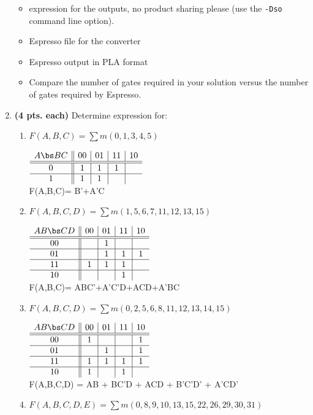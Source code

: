 \begin{enumerate}
\begin{itemize}
\item \SOPmin expression for the outputs, no product sharing please
(use the \verb+-Dso+ command line option).
\item Espresso file for the converter
\item Espresso output in PLA format
\item Compare the number of gates required in your solution
versus the number of gates required by Espresso.
\end{itemize}

\item {\bf (4 pts. each)} Determine \SOPmin expression for:
\begin{enumerate}
\item $F(A,B,C)=\sum m(0,1,3,4,5)$

\begin{solution}{
$\begin{array} {c||c|c|c|c}
   A   \bs B C  & 00 & 01 & 11 & 10 \\ \hline \hline
       0        &  1 & 1  & 1  &    \\ \hline
       1        &  1 & 1  &    &    \\ 
\end{array}$ \\
F(A,B,C)= B'+A'C
} \end{solution}
\item $F(A,B,C,D)=\sum m(1,5,6,7,11,12,13,15)$

\begin{solution}{
$\begin{array} {c||c|c|c|c}
   A B \bs C D   & 00 & 01 & 11 & 10 \\ \hline \hline
       00        &    & 1  &    &    \\ \hline
       01        &    & 1  & 1  & 1  \\ \hline
       11        & 1  & 1  & 1  &    \\ \hline
       10        &    &    & 1  &    \\
\end{array}$  \\
F(A,B,C)= ABC'+A'C'D+ACD+A'BC
} \end{solution}
\item $F(A,B,C,D)=\sum m(0,2,5,6,8,11,12,13,14,15)$

\begin{solution}{
$\begin{array} {c||c|c|c|c}
   A B \bs C D   & 00 & 01 & 11 & 10 \\ \hline \hline
       00        & 1  &    &    & 1  \\ \hline
       01        &    & 1  &    & 1  \\ \hline
       11        & 1  & 1  & 1  & 1  \\ \hline
       10        & 1  &    & 1  &    \\
\end{array}$  \\
F(A,B,C,D) =  AB + BC'D + ACD + B'C'D' + A'CD'
} \end{solution}
\item $F(A,B,C,D,E)=\sum m(0,8,9,10,13,15,22,26,29,30,31)$


\end{enumerate}
\end{enumerate}
